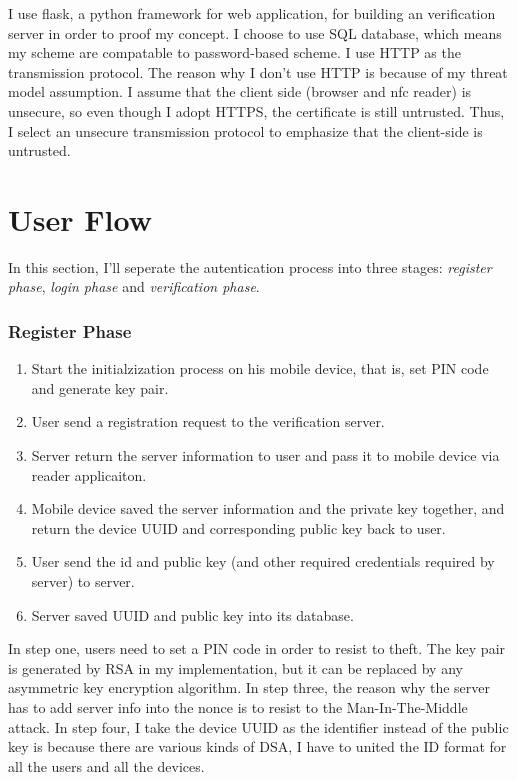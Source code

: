 \begin{CJK}{Bg5}{bsmi}
I use flask, a python framework for web application, for building an verification server in order to proof my concept. I choose to use SQL database, which means my scheme are compatable to password-based scheme. I use HTTP as the transmission protocol. The reason why I don't use HTTP is because of my threat model assumption. I assume that the client side (browser and nfc reader) is unsecure, so even though I adopt HTTPS, the certificate is still untrusted. Thus, I select an unsecure transmission protocol to emphasize that the client-side is untrusted.

\section{User Flow}

In this section, I'll seperate the autentication process into three stages: \emph{register phase}, \emph{login phase} and \emph{verification phase}.

\subsubsection{Register Phase}

\begin{enumerate}
\item Start the initialzization process on his mobile device, that is, set PIN code and generate key pair.
\item User send a registration request to the verification server.
\item Server return the server information to user and pass it to mobile device via reader applicaiton.
\item Mobile device saved the server information and the private key together, and return the device UUID and corresponding public key back to user.
\item User send the id and public key (and other required credentials required by server) to server.
\item Server saved UUID and public key into its database.
\end{enumerate}

In step one, users need to set a PIN code in order to resist to theft. The key pair is generated by RSA in my implementation, but it can be replaced by any asymmetric key encryption algorithm. In step three, the reason why the server has to add server info into the nonce is to resist to the Man-In-The-Middle attack. In step four, I take the device UUID as the identifier instead of the public key is because there are various kinds of DSA, I have to united the ID format for all the users and all the devices.


\end{CJK}
